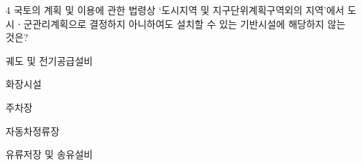 \begin{question}{4}
국토의 계획 및 이용에 관한 법령상 ‘도시지역 및 지구단위계획구역외의 지역’에서 도시ㆍ군관리계획으로 결정하지 아니하여도 설치할 수 있는 기반시설에 해당하지 않는 것은?
\begin{choices}
  \item 궤도 및 전기공급설비
  \item 화장시설
  \item 주차장
  \item 자동차정류장
  \item 유류저장 및 송유설비
\end{choices}
\end{question}

